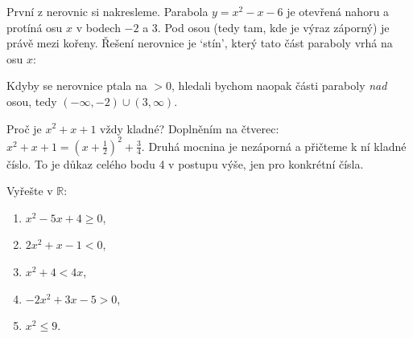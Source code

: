 První z nerovnic si nakresleme. Parabola $y = x^2 - x - 6$ je otevřená nahoru a protíná osu $x$ v bodech $-2$ a $3$. Pod osou (tedy tam, kde je výraz záporný) je právě mezi kořeny. Řešení nerovnice je `stín', který tato část paraboly vrhá na osu $x$:
\begin{center}
\end{center}
Kdyby se nerovnice ptala na $> 0$, hledali bychom naopak části paraboly \textit{nad} osou, tedy $(-\infty, -2)\cup(3, \infty)$.

\begin{note}
  Proč je $x^2 + x + 1$ vždy kladné? Doplněním na čtverec: $x^2 + x + 1 = {\left(x + \frac{1}{2}\right)}^2 + \frac{3}{4}$. Druhá mocnina je nezáporná a přičteme k ní kladné číslo. To je důkaz celého bodu 4 v postupu výše, jen pro konkrétní čísla.
\end{note}

\begin{problem}
  Vyřešte v $\mathbb{R}$:
  \begin{enumerate}[label=(\alph*)]
    \item $x^2 - 5x + 4\geq 0$,
    \item $2x^2 + x - 1 < 0$,
    \item $x^2 + 4 < 4x$,
    \item $-2x^2 + 3x - 5 > 0$,
    \item $x^2\leq 9$.
  \end{enumerate}
\end{problem}

